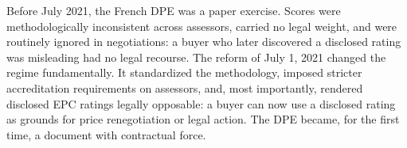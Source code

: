 Before July 2021, the French DPE was a paper exercise. Scores were methodologically inconsistent across assessors, carried no legal weight, and were routinely ignored in negotiations: a buyer who later discovered a disclosed rating was misleading had no legal recourse. The reform of July 1, 2021 changed the regime fundamentally. It standardized the methodology, imposed stricter accreditation requirements on assessors, and, most importantly, rendered disclosed EPC ratings legally opposable: a buyer can now use a disclosed rating as grounds for price renegotiation or legal action. The DPE became, for the first time, a document with contractual force.
